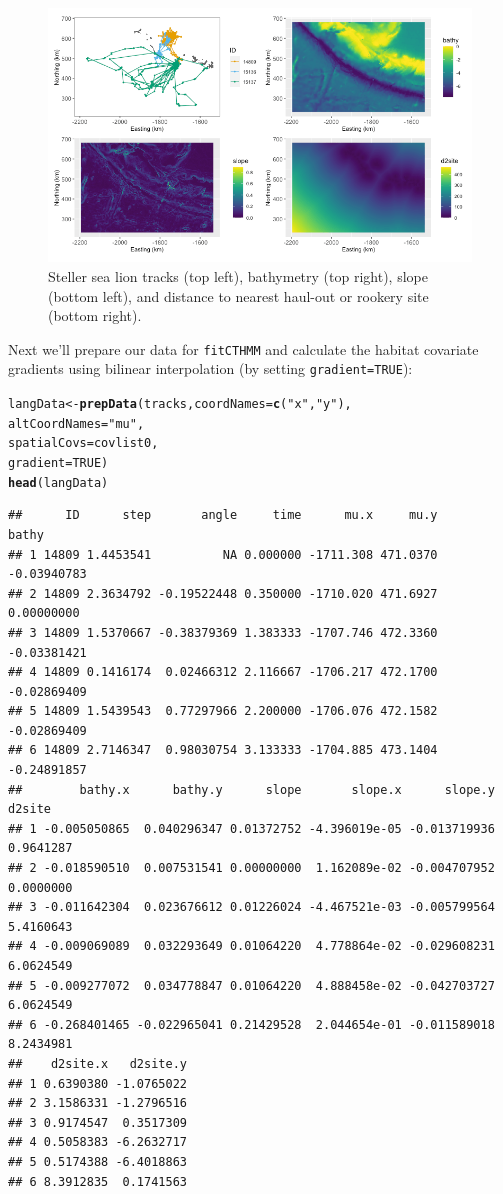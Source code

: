 \documentclass[12pt]{article}\usepackage[]{graphicx}\usepackage[]{xcolor}
\makeatletter
\newcommand{\hlnum}[1]{\textcolor[rgb]{0.686,0.059,0.569}{#1}}%
\newcommand{\hlstr}[1]{\textcolor[rgb]{0.192,0.494,0.8}{#1}}%
\newcommand{\hlstd}[1]{\textcolor[rgb]{0.345,0.345,0.345}{#1}}%
\newcommand{\hlkwb}[1]{\textcolor[rgb]{0.69,0.353,0.396}{#1}}%
\newcommand{\hlkwc}[1]{\textcolor[rgb]{0.333,0.667,0.333}{#1}}%
\newcommand{\hlkwd}[1]{\textcolor[rgb]{0.737,0.353,0.396}{\textbf{#1}}}%
\newenvironment{kframe}{%
 \def\at@end@of@kframe{}%
 \ifinner\ifhmode%
  \def\at@end@of@kframe{\end{minipage}}%
  \begin{minipage}{\columnwidth}%
 \fi\fi%
 \def\FrameCommand##1{\hskip\@totalleftmargin \hskip-\fboxsep
 \colorbox{shadecolor}{##1}\hskip-\fboxsep
     \hskip-\linewidth \hskip-\@totalleftmargin \hskip\columnwidth}%
 \MakeFramed {\advance\hsize-\width
   \@totalleftmargin\z@ \linewidth\hsize
   \@setminipage}}%
 {\par\unskip\endMakeFramed%
 \at@end@of@kframe}
\newenvironment{knitrout}{}{} %
\makeatother
\begin{document}
\begin{figure}
\center
\includegraphics[width=1\textwidth]{plot_langevinCovs.png}
\caption{Steller sea lion tracks (top left), bathymetry (top right), slope (bottom left), and distance to nearest haul-out or rookery site (bottom right).}
\end{figure}
\noindent Next we'll prepare our data for \verb|fitCTHMM| and calculate the habitat covariate gradients using bilinear interpolation (by setting \verb|gradient=TRUE|):
\begin{knitrout}
\color{fgcolor}\begin{kframe}
\begin{alltt}
\hlstd{langData} \hlkwb{<-} \hlkwd{prepData}\hlstd{(tracks,}\hlkwc{coordNames} \hlstd{=} \hlkwd{c}\hlstd{(}\hlstr{"x"}\hlstd{,}\hlstr{"y"}\hlstd{),}
                      \hlkwc{altCoordNames} \hlstd{=} \hlstr{"mu"}\hlstd{,}
                      \hlkwc{spatialCovs} \hlstd{= covlist0,}
                      \hlkwc{gradient}\hlstd{=}\hlnum{TRUE}\hlstd{)}
\hlkwd{head}\hlstd{(langData)}
\end{alltt}
\begin{verbatim}
##      ID      step       angle     time      mu.x     mu.y       bathy
## 1 14809 1.4453541          NA 0.000000 -1711.308 471.0370 -0.03940783
## 2 14809 2.3634792 -0.19522448 0.350000 -1710.020 471.6927  0.00000000
## 3 14809 1.5370667 -0.38379369 1.383333 -1707.746 472.3360 -0.03381421
## 4 14809 0.1416174  0.02466312 2.116667 -1706.217 472.1700 -0.02869409
## 5 14809 1.5439543  0.77297966 2.200000 -1706.076 472.1582 -0.02869409
## 6 14809 2.7146347  0.98030754 3.133333 -1704.885 473.1404 -0.24891857
##        bathy.x      bathy.y      slope       slope.x      slope.y    d2site
## 1 -0.005050865  0.040296347 0.01372752 -4.396019e-05 -0.013719936 0.9641287
## 2 -0.018590510  0.007531541 0.00000000  1.162089e-02 -0.004707952 0.0000000
## 3 -0.011642304  0.023676612 0.01226024 -4.467521e-03 -0.005799564 5.4160643
## 4 -0.009069089  0.032293649 0.01064220  4.778864e-02 -0.029608231 6.0624549
## 5 -0.009277072  0.034778847 0.01064220  4.888458e-02 -0.042703727 6.0624549
## 6 -0.268401465 -0.022965041 0.21429528  2.044654e-01 -0.011589018 8.2434981
##    d2site.x   d2site.y
## 1 0.6390380 -1.0765022
## 2 3.1586331 -1.2796516
## 3 0.9174547  0.3517309
## 4 0.5058383 -6.2632717
## 5 0.5174388 -6.4018863
## 6 8.3912835  0.1741563
\end{verbatim}
\end{kframe}
\end{knitrout}
\end{document}
